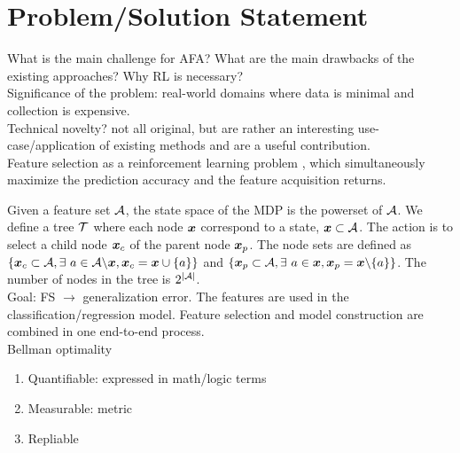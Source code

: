 \section{Problem/Solution Statement}

What is the main challenge for AFA? What are the main drawbacks of the existing approaches? Why RL is necessary?\\

Significance of the problem: real-world domains where data is minimal and collection is expensive.\\

Technical novelty? not all original, but are rather an interesting use-case/application of existing methods and are a useful contribution.\\ 


Feature selection as a reinforcement learning problem \citep{gaudel_feature_2010}, which simultaneously maximize the prediction accuracy and the feature acquisition returns.

Given a feature set $\mathcal{A}$, the state space of the MDP is the powerset of $\mathcal{A}$. We define a tree $\mathcal{T}$ where each node $\bm x$ correspond to a state, $\bm x \subset \mathcal{A}$. The action is to select a child node $\bm x_c$ of the parent node $\bm x_p$. The node sets are defined as $\{\bm x_c \subset \mathcal{A}, \exists ~ a \in \mathcal{A} \backslash \bm x, \bm x_c = \bm x \cup \{a\}\}$ and $\{\bm x_p \subset \mathcal{A}, \exists ~ a \in \bm x, \bm x_p = \bm x \backslash \{a\}\}$. The number of nodes in the tree is $2^{|\mathcal{A}|}$.\\

Goal: FS $\rightarrow$ generalization error. The features are used in the classification/regression model. Feature selection and model construction are combined in one end-to-end process.\\


Bellman optimality

\begin{enumerate}
\item
Quantifiable: expressed in math/logic terms
\item
Measurable: metric
\item
Repliable
\end{enumerate}

